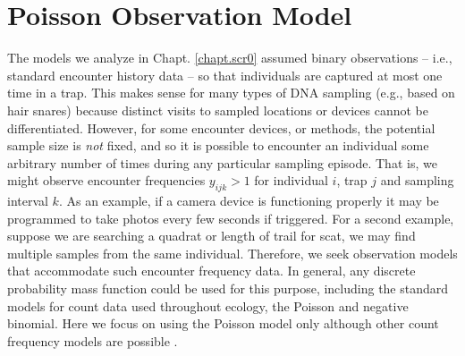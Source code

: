 \section{Poisson Observation Model}

The models we analyze in Chapt. \ref{chapt.scr0} assumed binary
observations -- i.e., standard encounter history data -- so
that individuals are captured at most one time in a trap.  This makes
sense for many types of DNA sampling (e.g., based on hair snares)
because distinct visits to sampled locations or devices cannot be
differentiated. However, for some encounter devices, or methods, the
potential sample size is {\it not} fixed, and so it is 
possible to encounter an individual some arbitrary number of times
during any particular sampling episode.
That is, we might observe
encounter frequencies $y_{ijk}>1$
for individual $i$, trap $j$ and
sampling interval $k$.  As an example, if a camera device is
functioning properly it may be programmed to take photos every few
seconds if triggered.  For a second example, suppose we are searching
a quadrat or length of trail for scat, we may find multiple samples from the same
individual.
Therefore, we seek observation models that accommodate such encounter
frequency data.  In general, any discrete probability mass function
could be used for this purpose, including the standard models for
count data used throughout ecology, the Poisson and negative
binomial.  Here we focus on using the Poisson
model only although other count frequency models are possible 
\citep{efford_etal:2009ecol}.

